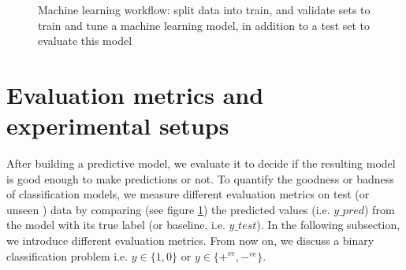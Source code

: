 \begin{figure}[htb]
	\begin{center}
		\caption[Machine learning workflow]{Machine learning workflow: split data into train, and validate sets to train and tune a machine learning model, in addition to a test set to evaluate this model}
		\label{fig:ml1}
	\end{center}
\end{figure}

\section{Evaluation metrics and experimental setups}
After building a predictive model, we evaluate it to decide if the resulting model is good enough to make predictions or not. To quantify the goodness or badness of classification models, we measure different evaluation metrics on test (or unseen ) data by comparing (see figure \ref{fig:ml1}) the predicted values (i.e. $y\_pred$) from the model with its true label (or baseline, i.e. $y\_test$). In the following subsection, we introduce different evaluation metrics. From now on, we discuss a binary classification problem i.e. $y \in \{1,0\}$ or $y \in \{+^{ve}, -^{ve}\}$.

